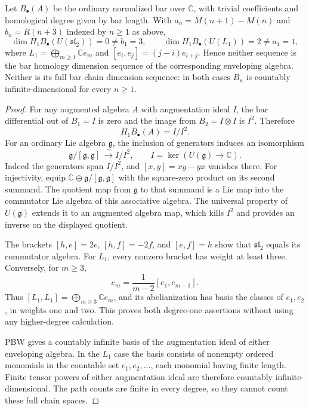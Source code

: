 \begin{theorem}
\label{thm:carrier-planar-reconstruction}
Let $B_\bullet(A)$ be the ordinary normalized bar over $\mathbb C$, with
trivial coefficients and homological degree given by bar length.  With
$a_n=M(n+1)-M(n)$ and $b_n=R(n+3)$ indexed by $n\ge1$ as above,
\[
 \dim H_1 B_\bullet(U(\mathfrak{sl}_2))=0\ne b_1=3,
 \qquad
 \dim H_1 B_\bullet(U(L_1))=2\ne a_1=1,
\]
where $L_1=\bigoplus_{m\ge1}\mathbb C e_m$ and
$[e_i,e_j]=(j-i)e_{i+j}$.
Hence neither sequence is the bar homology dimension sequence of the
corresponding enveloping algebra.  Neither is its full bar chain dimension
sequence: in both cases $B_n$ is countably infinite-dimensional for every
$n\ge1$.
\end{theorem}
\begin{proof}
For any augmented algebra $A$ with augmentation ideal $I$, the bar
differential out of $B_1=I$ is zero and the image from $B_2=I\otimes I$ is
$I^2$.  Therefore
\[
 H_1B_\bullet(A)=I/I^2.
\]
For an ordinary Lie algebra $\mathfrak g$, the inclusion of generators
induces an isomorphism
\[
 \mathfrak g/[\mathfrak g,\mathfrak g]\ \xrightarrow{\ \sim\ }
 I/I^2,\qquad I=\ker(U(\mathfrak g)\to\mathbb C).
\]
Indeed the generators span $I/I^2$, and
$[x,y]=xy-yx$ vanishes there.  For injectivity, equip
$\mathbb C\oplus\mathfrak g/[\mathfrak g,\mathfrak g]$ with the square-zero
product on its second summand.  The quotient map from $\mathfrak g$ to that
summand is a Lie map into the commutator Lie algebra of this associative
algebra.  The universal property of $U(\mathfrak g)$ extends it to an
augmented algebra map, which kills $I^2$ and provides an inverse on the
displayed quotient.

The brackets $[h,e]=2e$, $[h,f]=-2f$, and $[e,f]=h$ show that
$\mathfrak{sl}_2$ equals its commutator algebra.  For $L_1$, every nonzero
bracket has weight at least three.  Conversely, for $m\ge3$,
\[
 e_m=\frac{1}{m-2}[e_1,e_{m-1}].
\]
Thus $[L_1,L_1]=\bigoplus_{m\ge3}\mathbb C e_m$, and its abelianization
has basis the classes of $e_1,e_2$, in weights one and two.  This proves
both degree-one assertions without using any higher-degree calculation.

PBW gives a countably infinite basis of the augmentation ideal of either
enveloping algebra.  In the $L_1$ case the basis consists of nonempty
ordered monomials in the countable set $e_1,e_2,\ldots$, each monomial
having finite length.  Finite tensor powers of either augmentation ideal
are therefore countably infinite-dimensional.  The path counts are finite
in every degree, so they cannot count these full chain spaces.
\end{proof}

